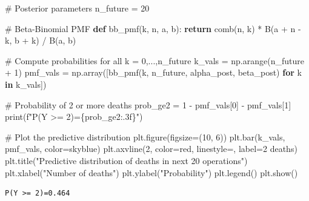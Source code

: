 \documentclass[
  letterpaper,
  DIV=11,
  numbers=noendperiod]{scrartcl}
\newenvironment{Shaded}{\begin{snugshade}}{\end{snugshade}}
\newcommand{\BuiltInTok}[1]{\textcolor[rgb]{0.00,0.23,0.31}{#1}}
\newcommand{\CommentTok}[1]{\textcolor[rgb]{0.37,0.37,0.37}{#1}}
\newcommand{\ControlFlowTok}[1]{\textcolor[rgb]{0.00,0.23,0.31}{\textbf{#1}}}
\newcommand{\DecValTok}[1]{\textcolor[rgb]{0.68,0.00,0.00}{#1}}
\newcommand{\KeywordTok}[1]{\textcolor[rgb]{0.00,0.23,0.31}{\textbf{#1}}}
\newcommand{\NormalTok}[1]{\textcolor[rgb]{0.00,0.23,0.31}{#1}}
\newcommand{\OperatorTok}[1]{\textcolor[rgb]{0.37,0.37,0.37}{#1}}
\newcommand{\SpecialCharTok}[1]{\textcolor[rgb]{0.37,0.37,0.37}{#1}}
\newcommand{\SpecialStringTok}[1]{\textcolor[rgb]{0.13,0.47,0.30}{#1}}
\newcommand{\StringTok}[1]{\textcolor[rgb]{0.13,0.47,0.30}{#1}}
\begin{document}
\begin{Shaded}
\begin{Highlighting}[]
\CommentTok{\# Posterior parameters}
\NormalTok{n\_future }\OperatorTok{=} \DecValTok{20}

\CommentTok{\# Beta{-}Binomial PMF}
\KeywordTok{def}\NormalTok{ bb\_pmf(k, n, a, b):}
    \ControlFlowTok{return}\NormalTok{ comb(n, k) }\OperatorTok{*}\NormalTok{ B(a }\OperatorTok{+}\NormalTok{ n }\OperatorTok{{-}}\NormalTok{ k, b }\OperatorTok{+}\NormalTok{ k) }\OperatorTok{/}\NormalTok{ B(a, b)}

\CommentTok{\# Compute probabilities for all k = 0,...,n\_future}
\NormalTok{k\_vals }\OperatorTok{=}\NormalTok{ np.arange(n\_future }\OperatorTok{+} \DecValTok{1}\NormalTok{)}
\NormalTok{pmf\_vals }\OperatorTok{=}\NormalTok{ np.array([bb\_pmf(k, n\_future, alpha\_post, beta\_post) }\ControlFlowTok{for}\NormalTok{ k }\KeywordTok{in}\NormalTok{ k\_vals])}

\CommentTok{\# Probability of 2 or more deaths}
\NormalTok{prob\_ge2 }\OperatorTok{=} \DecValTok{1} \OperatorTok{{-}}\NormalTok{ pmf\_vals[}\DecValTok{0}\NormalTok{] }\OperatorTok{{-}}\NormalTok{ pmf\_vals[}\DecValTok{1}\NormalTok{]}
\BuiltInTok{print}\NormalTok{(}\SpecialStringTok{f"P(Y \textgreater{}= 2)=}\SpecialCharTok{\{}\NormalTok{prob\_ge2}\SpecialCharTok{:.3f\}}\SpecialStringTok{"}\NormalTok{)}

\CommentTok{\# Plot the predictive distribution}
\NormalTok{plt.figure(figsize}\OperatorTok{=}\NormalTok{(}\DecValTok{10}\NormalTok{, }\DecValTok{6}\NormalTok{))}
\NormalTok{plt.bar(k\_vals, pmf\_vals, color}\OperatorTok{=}\StringTok{\textquotesingle{}skyblue\textquotesingle{}}\NormalTok{)}
\NormalTok{plt.axvline(}\DecValTok{2}\NormalTok{, color}\OperatorTok{=}\StringTok{\textquotesingle{}red\textquotesingle{}}\NormalTok{, linestyle}\OperatorTok{=}\StringTok{\textquotesingle{}{-}{-}\textquotesingle{}}\NormalTok{, label}\OperatorTok{=}\StringTok{\textquotesingle{}2 deaths\textquotesingle{}}\NormalTok{)}
\NormalTok{plt.title(}\StringTok{"Predictive distribution of deaths in next 20 operations"}\NormalTok{)}
\NormalTok{plt.xlabel(}\StringTok{"Number of deaths"}\NormalTok{)}
\NormalTok{plt.ylabel(}\StringTok{"Probability"}\NormalTok{)}
\NormalTok{plt.legend()}
\NormalTok{plt.show()}
\end{Highlighting}
\end{Shaded}

\begin{verbatim}
P(Y >= 2)=0.464
\end{verbatim}
\end{document}
